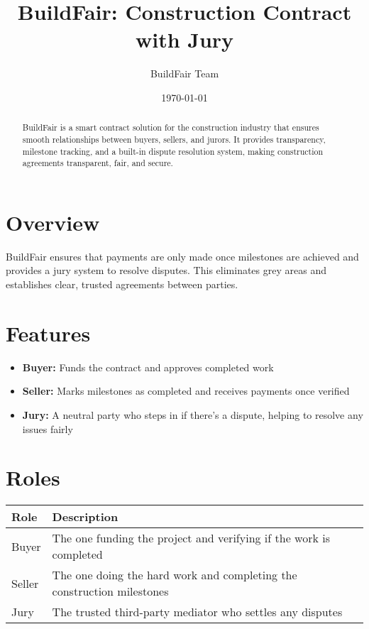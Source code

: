 \documentclass{article}
\title{BuildFair: Construction Contract with Jury}
\author{BuildFair Team}
\date{\today}
\begin{document}
\maketitle

\begin{abstract}
BuildFair is a smart contract solution for the construction industry that ensures smooth relationships between buyers, sellers, and jurors. It provides transparency, milestone tracking, and a built-in dispute resolution system, making construction agreements transparent, fair, and secure.
\end{abstract}

\section{Overview}
BuildFair ensures that payments are only made once milestones are achieved and provides a jury system to resolve disputes. This eliminates grey areas and establishes clear, trusted agreements between parties.

\section{Features}
\begin{itemize}
    \item \textbf{Buyer:} Funds the contract and approves completed work
    \item \textbf{Seller:} Marks milestones as completed and receives payments once verified
    \item \textbf{Jury:} A neutral party who steps in if there's a dispute, helping to resolve any issues fairly
\end{itemize}

\section{Roles}
\begin{table}[h]
\begin{tabular}{ll}
\toprule
\textbf{Role} & \textbf{Description} \\
\midrule
Buyer & The one funding the project and verifying if the work is completed \\
Seller & The one doing the hard work and completing the construction milestones \\
Jury & The trusted third-party mediator who settles any disputes \\
\bottomrule
\end{tabular}
\end{table}
\end{document}
